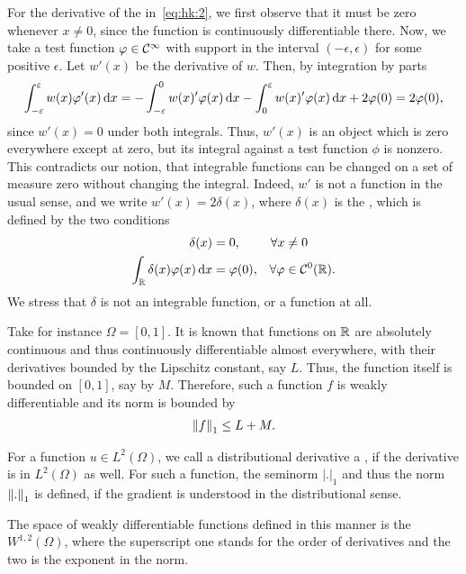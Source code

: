 \begin{example}
  For the derivative of the 
  in~\eqref{eq:hk:2}, we first observe that it must be zero whenever
  $x\neq 0$, since the function is continuously differentiable
  there. Now, we take a test function $\varphi\in\mathcal C^\infty$ with support
  in the interval $(-\epsilon,\epsilon)$ for some positive
  $\epsilon$. Let $w'(x)$ be the derivative of $w$. Then, by
  integration by parts
  \begin{gather*}
    \int_{-\varepsilon}^\varepsilon w(x) \varphi'(x)\,\mathrm{d} x
    = -\int_{-\varepsilon}^0 w(x)' \varphi(x)\,\mathrm{d} x
    -\int_0^\varepsilon w(x)' \varphi(x)\,\mathrm{d} x
    + 2 \varphi(0) = 2\varphi(0),
  \end{gather*}
  since $w'(x) = 0$ under both integrals. Thus, $w'(x)$ is an object
  which is zero everywhere except at zero, but its integral against a
  test function $\phi$ is nonzero. This contradicts our notion, that
  integrable functions can be changed on a set of measure zero without
  changing the integral. Indeed, $w'$ is not a function in the usual
  sense, and we write $w'(x) = 2 \delta(x)$, where $\delta(x)$ is the
  , which is defined by the two
  conditions
  \begin{gather*}
    \begin{alignedat}{2}
      \delta(x) &= 0, & \forall x & \neq 0
      \\
      \int_\mathbb R \delta(x) \varphi(x)\,\mathrm{d} x &= \varphi(0), \quad & \forall \varphi
      &\in \mathcal C^0(\mathbb R).
    \end{alignedat}
  \end{gather*}
  We stress that $\delta$ is not an integrable function, or a function
  at all.
\end{example}


\begin{example}
   Take for instance $\Omega
  = [0,1]$. It is known that 
  functions on $\mathbb R$ are absolutely continuous and thus continuously
  differentiable almost everywhere, with their derivatives bounded by
  the Lipschitz constant, say $L$. Thus, the function itself is
  bounded on $[0,1]$, say by $M$. Therefore, such a function $f$ is
  weakly differentiable and its norm is bounded by
  \begin{gather*}
    \left\|f\right\|_1 \le L+M.
  \end{gather*}
\end{example}

\begin{definition}
  For a function $u\in L^2(\Omega)$, we call a distributional
  derivative a , if the derivative is in
  $L^2(\Omega)$ as well. For such a  function,
  the seminorm $|.|_1$ and thus the norm $\left\|.\right\|_1$ is defined, if
  the gradient is understood in the distributional sense.
  
  The space of weakly differentiable functions defined in this manner
  is the  $W^{1,2}(\Omega)$, where the
  superscript one stands for the order of derivatives and the two is
  the exponent in the norm.
\end{definition}

